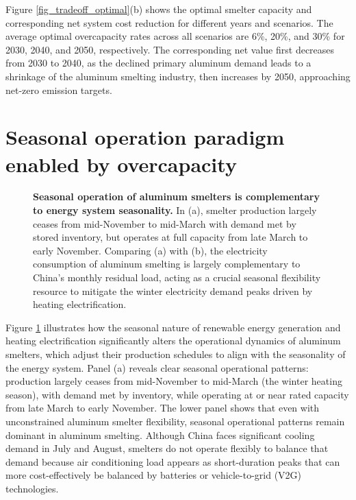 \documentclass[preprint]{elsarticle}
\begin{document}
Figure \ref{fig_tradeoff_optimal}(b) shows the optimal smelter capacity and corresponding net system cost reduction for different years and scenarios. The average optimal overcapacity rates across all scenarios are 6\%, 20\%, and 30\% for 2030, 2040, and 2050, respectively. The corresponding net value first decreases from 2030 to 2040, as the declined primary aluminum demand leads to a shrinkage of the aluminum smelting industry, then increases by 2050, approaching net-zero emission targets.

\section*{\textbf{Seasonal operation paradigm enabled by overcapacity}}

\begin{figure}[H]
\centering
\caption{\textbf{Seasonal operation of aluminum smelters is complementary to energy system seasonality.} In (a), smelter production largely ceases from mid-November to mid-March with demand met by stored inventory, but operates at full capacity from late March to early November. Comparing (a) with (b), the electricity consumption of aluminum smelting is largely complementary to China's monthly residual load, acting as a crucial seasonal flexibility resource to mitigate the winter electricity demand peaks driven by heating electrification.}
\label{fig_operation_demand}
\end{figure}

Figure \ref{fig_operation_demand} illustrates how the seasonal nature of renewable energy generation and heating electrification significantly alters the operational dynamics of aluminum smelters, which adjust their production schedules to align with the seasonality of the energy system. Panel (a) reveals clear seasonal operational patterns: production largely ceases from mid-November to mid-March (the winter heating season), with demand met by inventory, while operating at or near rated capacity from late March to early November. The lower panel shows that even with unconstrained aluminum smelter flexibility, seasonal operational patterns remain dominant in aluminum smelting. Although China faces significant cooling demand in July and August, smelters do not operate flexibly to balance that demand because air conditioning load appears as short-duration peaks that can more cost-effectively be balanced by batteries or vehicle-to-grid (V2G) technologies.
\end{document}
